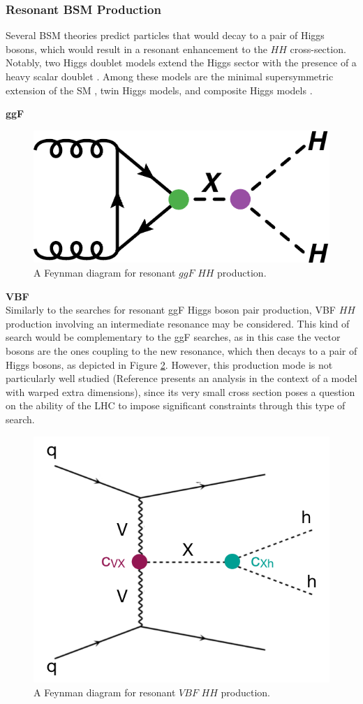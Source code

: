 \subsubsection{Resonant BSM Production}

Several \gls{BSM} theories predict particles that would decay to a pair of Higgs bosons, which would result in a resonant enhancement to the $HH$ cross-section. Notably, two Higgs doublet models extend the Higgs sector with the presence of a heavy scalar doublet \cite{THDM}. Among these models are the minimal supersymmetric extension of the \gls{SM} \cite{mssm}, twin Higgs models, and composite Higgs models \cite{compositeHiggs}.

\noindent\textbf{\gls{ggF}}\\
\indent


\begin{figure}[!ht]
    \centering
    \includegraphics[width=.6\textwidth]{chapters/chapter1_theory/images/hh_res_ggf.pdf}
    \caption{A Feynman diagram for resonant $ggF$  $HH$ production.}
    \label{fig:ggf-resonant}
\end{figure}

\noindent\textbf{VBF}\\
\indent Similarly to the searches for resonant ggF Higgs boson pair production, \gls{VBF} $HH$
production involving an intermediate resonance may be considered. This kind of search would be complementary to the ggF searches, as in this case the vector bosons are the ones coupling to the new resonance, which then decays to a pair of Higgs bosons, as depicted in Figure \ref{fig:vbf-resonant}. However, this production mode is not
particularly well studied (Reference \cite{res_vbf} presents an analysis in the context of a model with warped extra dimensions), since its very small cross section poses a question on the ability of the LHC to impose significant constraints through this type of search.

\begin{figure}[!ht]
    \centering
    \includegraphics[width=.6\textwidth]{chapters/chapter1_theory/images/vbf_resonant.png}
    \caption{A Feynman diagram for resonant $VBF$  $HH$ production.}
    \label{fig:vbf-resonant}
\end{figure}


